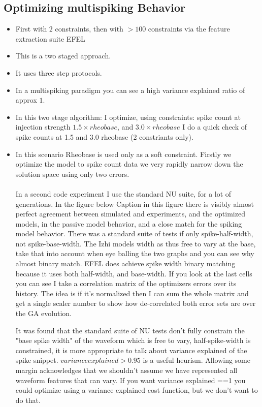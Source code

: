 \documentclass{report}
\begin{document}
\subsection{Optimizing multispiking Behavior}
\begin{itemize}
\item First with $2$ constraints, then with $>100$ constraints via the feature extraction suite EFEL

\item This is a two staged approach. 
\item It uses three step protocols.

\item In a multispiking paradigm you can see a high variance explained ratio of approx $1$.  

\item In this two stage algorithm: I optimize, using constraints: spike count at injection strength $1.5 \times rheobase $, and $3.0 \times rheobase $
I do a quick check of spike counts at 1.5 and 3.0 rheobase (2 constriants only).

\item In this scenario Rheobase is used only as a soft constraint. Firstly we optimize the model to spike count data we very rapidly narrow down the solution space using only two errors. \\
\\
In a second code experiment I use the standard NU suite, for a lot of generations. In the figure below
Caption in this figure there is visibly almost perfect agreement between simulated and experiments, and the optimized models, in the passive model behavior, and a close match for the spiking model behavior. There was a standard suite of tests if only spike-half-width, not spike-base-width. The Izhi models width as thus free to vary at the base, take that into account when eye balling the two graphs and you can see why almost binary match. EFEL does achieve spike width binary matching because it uses both half-width, and base-width. If you look at the last cells you can see I take a correlation matrix of the optimizers errors over its history. The idea is if it's normalized then I can sum the whole matrix and get a single scaler number to show how de-correlated both error sets are over the GA evolution. 

It was found that the standard suite of NU tests don't fully constrain the "base spike width" of the waveform which is free to vary, half-spike-width is constrained, it is more appropriate to talk about variance explained of the spike snippet. $variance explained>0.95$ is a useful heurism. Allowing some margin acknowledges that we shouldn't assume we have represented all waveform features that can vary. If you want variance explained ==1   you could optimize using a variance explained cost function, but we don't want to do that. 
\end{itemize}
\end{document}
